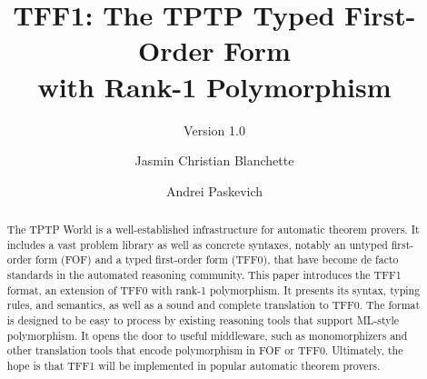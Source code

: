 \documentclass[a4paper]{llncs}
\begin{document}
\title{
TFF1: The TPTP Typed First-Order Form \\ with Rank-1
Polymorphism}
\subtitle{Version 1.0}

\author{
Jasmin Christian Blanchette \and
Andrei Paskevich
}


\maketitle

\begin{abstract}
The TPTP World is a well-established infrastructure for automatic theorem
provers. It includes a vast problem library as well as concrete syntaxes,
notably an untyped first-order form (FOF) and a typed first-order form (TFF0),
that have become de facto standards in the automated reasoning
community. This paper introduces the TFF1 format, an extension of TFF0 with
rank-1 polymorphism. It presents its syntax, typing rules, and semantics, as
well as a sound and complete translation to TFF0. The format is designed to be
easy to process by existing reasoning tools that support ML-style polymorphism.
It opens the door to useful middleware, such as monomorphizers and other
translation tools that encode polymorphism in FOF or TFF0. Ultimately, the hope
is that TFF1 will be implemented in popular automatic theorem provers.
\end{abstract}












\end{document}
